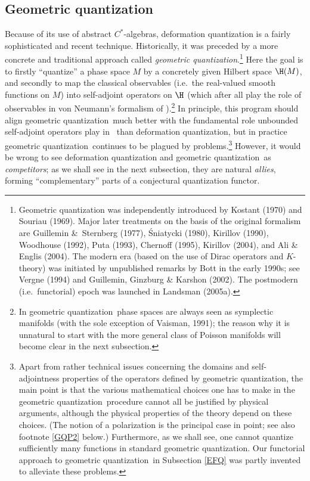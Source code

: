 \documentclass[12pt,titlepage]{article}
\newcommand{\ca}{$C^*$-algebra} \newcommand{\jba}{JB-algebra}
\newcommand{\gq}{geometric quantization}
\begin{document}
\subsection{Geometric quantization}\label{GQsection}
Because of its use of abstract \ca s, deformation quantization is a fairly sophisticated and recent technique.  Historically, it was preceded by a more concrete and traditional approach called {\it \gq}.\footnote{\label{GQrefs} Geometric quantization was independently introduced by  Kostant (1970) and Souriau (1969).  Major later treatments on the basis of the original formalism are  Guillemin  \&\ Sternberg (1977), \'{S}niatycki (1980),  Kirillov (1990),  Woodhouse (1992), Puta (1993), Chernoff (1995), Kirillov (2004), and Ali \& Englis (2004). The modern era (based on the use of Dirac operators and $K$-theory) was initiated  by unpublished remarks by Bott in the early 1990s; see Vergne (1994) and Guillemin, Ginzburg \&  Karshon (2002).
 The postmodern (i.e.\ functorial) epoch was launched  in Landsman (2005a).}
 Here the goal is to firstly ``quantize'' a phase space $M$ by a concretely given Hilbert space $\H(M)$, and secondly to map the classical observables (i.e.\ the real-valued smooth functions on $M$) into self-adjoint operators on $\H$ (which after all play the role of observables in von Neumann's formalism of \qm).\footnote{In \gq\ phase spaces are always seen as symplectic manifolds (with the sole exception of Vaisman,  1991); the reason why it is unnatural to start with the more general class of Poisson manifolds will become clear in the next subsection.} In  principle, this program should align \gq\ much better with the fundamental role unbounded self-adjoint operators play in \qm\ than deformation quantization, but in practice \gq\ continues to be plagued by  problems.\footnote{\label{GQP1} Apart from rather technical issues concerning the domains and  self-adjointness properties of the operators defined by \gq, the main point is that the various mathematical choices one has to make in the \gq\ procedure
 cannot all be justified by physical arguments, although the physical properties of the theory depend on these choices. (The notion of a polarization is the principal case in point; see also footnote \ref{GQP2} below.) Furthermore, as we shall see, one cannot quantize sufficiently many functions in standard \gq. Our functorial approach to \gq\ in Subsection \ref{EFQ} was partly invented to alleviate these problems.}
  However, it would be wrong to see deformation quantization and \gq\ as {\it competitors}; as we shall see in the next subsection, they are natural {\it allies}, forming ``complementary'' parts of a conjectural quantization functor. 
\end{document}
